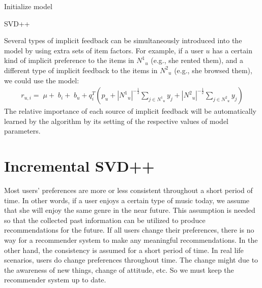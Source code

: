 \documentclass[oneside,13pt]{extreport}
\begin{document}
\begin{algorithm}[H]
 Initialize model\;
 \caption{SVD++}
\end{algorithm}
\clearpage

Several types of implicit feedback can be simultaneously introduced into the
model by using extra sets of item factors. For example, if a user $u$ has a certain
kind of implicit preference to the items in ${N^1}_u$ (e.g., she rented them), and a different
type of implicit feedback to the items in ${N^2}_u$ (e.g., she browsed them), we
could use the model: 
\begin{eqnarray}
\label{eq:svd++_pre2}
{r_{u,i}} = \;\mu  + \;{b_i} + \;{b_u} + q_i^T\left( {{p_u} + {{\left| {{N^1}_u} \right|}^{ - \frac{1}{2}}}\sum\limits_{j  \in {N^1}_u} {{y_j}}  + {{\left| {{N^2}_u} \right|}^{ - \frac{1}{2}}}\sum\limits_{j \in   {N^2}_u} {{y_j}} } \right)
\end{eqnarray}
The relative importance of each source of implicit feedback will be automatically
learned by the algorithm by its setting of the respective values of model parameters.
\section{Incremental SVD++}
\label{Incremental SVD++}
Most users’ preferences are more or less consistent throughout a short period of time. In other words, if a user enjoys a certain type of music today, we assume that she will enjoy the same genre in the near future. This assumption is needed so that the collected past information can be utilized to produce recommendations for the future. If all users change their preferences, there is no way for a recommender
system to make any meaningful recommendations. In the other hand, the consistency is assumed for a short period of time. In real life scenarios, users do change preferences throughout time. The change might due to the awareness of new things, change of attitude, etc. So we must keep the recommender system up to date.
\end{document}
